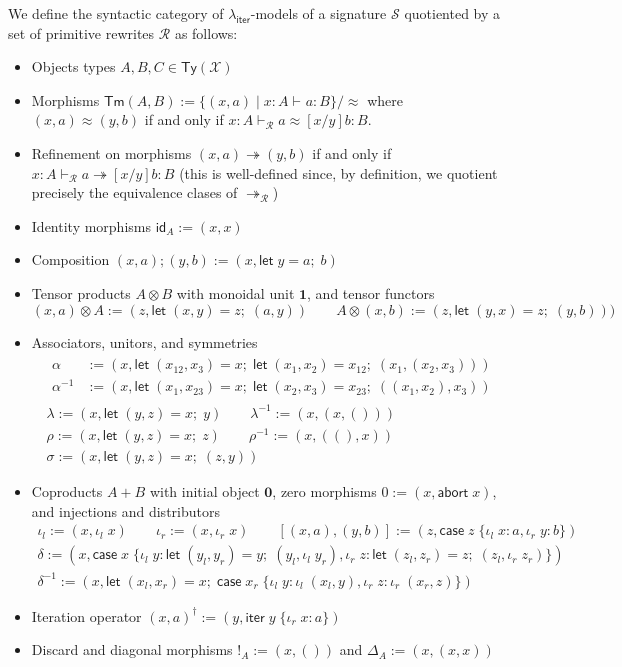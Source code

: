 \documentclass[acmsmall,screen,review]{acmart}
\newcommand{\mc}[1]{\ensuremath{\mathcal{#1}}}
\newcommand{\mb}[1]{\ensuremath{\mathbf{#1}}}
\newcommand{\ms}[1]{\ensuremath{\mathsf{#1}}}
\newcommand{\lto}{:}
\newcommand{\linl}[1]{\iota_l\;{#1}}
\newcommand{\linr}[1]{\iota_r\;{#1}}
\newcommand{\labort}[1]{\ms{abort}\;{#1}}
\newcommand{\letexpr}[3]{\ensuremath{\ms{let}\;#1 = #2;\;#3}}
\newcommand{\caseexpr}[5]{\ms{case}\;#1\;\{\linl{#2} \lto #3, \linr{#4} \lto #5\}}
\newcommand{\liter}[3]{\ms{iter}\;#1\;\{ \linr{#2} \lto #3 \}}
\newcommand{\hasty}[4]{#1 \vdash_{#2} #3: {#4}}
\newcommand{\teqv}{\approx}
\newcommand{\tref}{\twoheadrightarrow}
\newcommand{\tmle}[5]{#1 \vdash_{#2} #3 \tref #4 : {#5}}
\newcommand{\tmeq}[5]{#1 \vdash_{#2} #3 \teqv #4 : {#5}}
\newcommand{\subiterexp}{\texorpdfstring{\(\lambda_{\ms{iter}}\)}{lambda-iter}}
\begin{document}
\label{apx:syn-model}

We define the syntactic category of \subiterexp{}-models of a signature $\mc{S}$ quotiented by a set
of primitive rewrites $\mc{R}$ as follows:
\begin{itemize}
  \item Objects types $A, B, C \in \ms{Ty}(\mc{X})$
  \item Morphisms $\ms{Tm}(A, B) := \{(x, a) \mid \hasty{x : A}{}{a}{B}\} / \approx$ where $(x, a)
  \approx (y, b)$ if and only if $\tmeq{x : A}{\mc{R}}{a}{[x/y]b}{B}$. 
  \item Refinement on morphisms $(x, a) \tref (y, b)$ if and only if $\tmle{x :
  A}{\mc{R}}{a}{[x/y]b}{B}$ (this is well-defined since, by definition, we quotient precisely the
  equivalence clases of $\tref_{\mc{R}}$)
  \item Identity morphisms $\ms{id}_A := (x, x)$
  \item Composition $(x, a) ; (y, b) := (x, \letexpr{y}{a}{b})$
  \item Tensor products $A \otimes B$ with monoidal unit $\mb{1}$, and tensor functors
  $$
  (x, a) \otimes A := (z, \letexpr{(x, y)}{z}{(a, y)})
  \qquad
  A \otimes (x, b)
  := (z, \letexpr{(y, x)}{z}{(y, b)}))
  $$
  \item Associators, unitors, and symmetries
  \begin{gather*}
    \begin{aligned}
      \alpha 
      &:= (x, \letexpr{(x_{12}, x_3)}{x}{\letexpr{(x_1, x_2)}{x_{12}}{(x_1, (x_2, x_3))}}) 
      \\
      \alpha^{-1} 
      &:= (x, \letexpr{(x_1, x_{23})}{x}{\letexpr{(x_2, x_3)}{x_{23}}{((x_1, x_2), x_3)}})
    \end{aligned} \\
    \lambda := (x, \letexpr{(y, z)}{x}{y}) \qquad
    \lambda^{-1} := (x, (x, ())) \\
    \rho := (x, \letexpr{(y, z)}{x}{z}) \qquad
    \rho^{-1} := (x, ((), x)) \\
    \sigma := (x, \letexpr{(y, z)}{x}{(z, y)})
  \end{gather*}
  \item Coproducts \(A + B\) with initial object $\mb{0}$, zero morphisms $0 := (x, \labort{x})$,
  and injections and distributors
  \begin{gather*}
    \iota_l := (x, \linl{x}) \qquad \iota_r := (x, \linr{x}) \qquad
    [(x, a), (y, b)] := (z, \caseexpr{z}{x}{a}{y}{b}) \\
    \delta := (x, \caseexpr{x}
                          {y}{\letexpr{(y_l, y_r)}{y}{(y_l, \linl{y_r})}}
                          {z}{\letexpr{(z_l, z_r)}{z}{(z_l, \linr{z_r})}}) \\
    \delta^{-1} := (x, \letexpr{(x_l, x_r)}{x}{\caseexpr{x_r}
                                          {y}{\linl{(x_l, y)}}
                                          {z}{\linr{(x_r, z)}}})
  \end{gather*}
  \item Iteration operator
  $
    (x, a)^\dagger := (y, \liter{y}{x}{a})
  $
  \item Discard and diagonal morphisms $!_A := (x, ())$ and $\Delta_A := (x, (x, x))$
\end{itemize}
\end{document}
